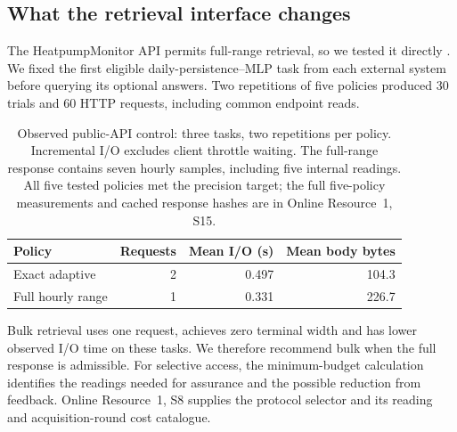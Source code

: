 \subsection{What the retrieval interface changes}
\label{sec:actual-api}
The HeatpumpMonitor API permits full-range retrieval, so we tested it
directly \citep{hpmapi,hpmcode}. We fixed the first eligible
daily-persistence--MLP task from each external system before querying its
optional answers. Two repetitions of five policies produced 30 trials
and 60 HTTP requests, including common endpoint reads.

\begin{table}[htbp]\centering\small
\caption{Observed public-API control: three tasks, two repetitions per
policy. Incremental I/O excludes client throttle waiting. The full-range
response contains seven hourly samples, including five internal readings.
All five tested policies met the precision
target; the full five-policy measurements and cached response hashes are
in Online Resource~1, S15.}\label{tab:actual-api}
\begin{tabular}{lrrr}\toprule
Policy & Requests & Mean I/O (s) & Mean body bytes\\\midrule
Exact adaptive & 2 & 0.497 & 104.3\\
Full hourly range & 1 & 0.331 & 226.7\\\bottomrule
\end{tabular}\end{table}

Bulk retrieval uses one request, achieves zero terminal width and has
lower observed I/O time on these tasks. We therefore recommend bulk when
the full response is admissible. For selective access, the minimum-budget
calculation identifies the readings needed for assurance and the possible
reduction from feedback. Online Resource~1, S8 supplies the protocol selector
and its reading and acquisition-round cost catalogue.
